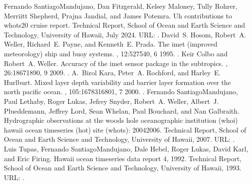 \documentclass[a4paper,10pt,english,openany,oneside]{sphinxmanual}
\begin{document}
\begin{sphinxthebibliography}{10}
\sphinxAtStartPar
Fernando Santiago\sphinxhyphen{}Mandujano, Dan Fitzgerald, Kelsey Maloney, Tully Rohrer, Merriitt Shepherd, Prajna Jandial, and James Potemra. Uh contributions to whots\sphinxhyphen{}20 cruise report. Technical Report, School of Ocean and Earth Science and Technology, University of Hawaii, July 2024. URL: .
\sphinxAtStartPar
David S. Hosom, Robert A. Weller, Richard E. Payne, and Kenneth E. Prada. The imet (improved meteorology) ship and buoy systems. , 12:527\textendash{}540, 6 1995. .
\sphinxAtStartPar
Keir Colbo and Robert A. Weller. Accuracy of the imet sensor package in the subtropics. , 26:1867\textendash{}1890, 9 2009. .
\sphinxAtStartPar
A. Birol Kara, Peter A. Rochford, and Harley E. Hurlburt. Mixed layer depth variability and barrier layer formation over the north pacific ocean. , 105:16783\textendash{}16801, 7 2000. .
\sphinxAtStartPar
Fernando Santiago\sphinxhyphen{}Mandujano, Paul Lethaby, Roger Lukas, Jefrey Snyder, Robert A. Weller, Albert J. Plueddemann, Jeffrey Lord, Sean Whelan, Paul Bouchard, and Nan Galbraith. Hydrographic observations at the woods hole oceanographic institution (whoi) hawaii ocean timeseries (hot) site (whots): 2004\sphinxhyphen{}2006. Technical Report, School of Ocean and Earth Science and Technology, University of Hawaii, 2007. URL: .
\sphinxAtStartPar
Luis Tupas, Fernando Santiago\sphinxhyphen{}Mandujano, Dale Hebel, Roger Lukas, David Karl, and Eric Firing. Hawaii ocean time\sphinxhyphen{}series data report 4, 1992. Technical Report, School of Ocean and Earth Science and Technology, University of Hawaii, 1993. URL: .
\sphinxAtStartPar

\end{sphinxthebibliography}
\end{document}
